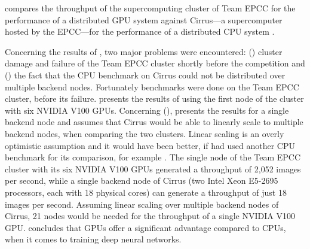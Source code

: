 \documentclass{article}
\begin{document}
\citet{nita_2018} compares the throughput of the
supercomputing cluster of Team EPCC for the performance of
a distributed GPU system against Cirrus---a supercomputer
hosted by the EPCC---for the performance of a distributed
CPU system \citep{cirrus}.

Concerning the results of \citet{nita_2018}, two major
problems were encountered: () cluster
damage and failure of the Team EPCC cluster shortly before
the competition and () the fact that the CPU
benchmark on Cirrus could not be distributed over multiple
backend nodes.
Fortunately benchmarks were done on the Team EPCC cluster,
before its failure.
\citet{nita_2018} presents the results of using the first node of the
cluster with six NVIDIA V100 GPUs.
Concerning (), \citet{nita_2018} presents
the results for a single backend node and assumes that
Cirrus would be able to linearly scale to multiple backend
nodes, when comparing the two clusters.
Linear scaling is an overly optimistic assumption and it would have
been better, if \citet{nita_2018} had used another CPU benchmark for
its comparison, for example \citet{you2017}.
The single node of the Team EPCC cluster with its six
NVIDIA V100 GPUs generated a throughput of 2,052 images per
second, while a single backend node of Cirrus (two Intel
Xeon E5-2695 processors, each with 18 physical cores) can
generate a throughput of just 18 images per second.
Assuming linear scaling over multiple backend nodes of
Cirrus, 21 nodes would be needed for the throughput of a
single NVIDIA V100 GPU.
\citet{nita_2018} concludes that GPUs offer a significant
advantage compared to CPUs, when it comes to training
deep neural networks.
\end{document}
